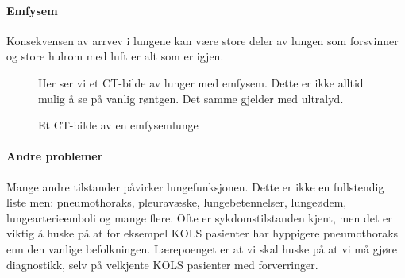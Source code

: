 			\paragraph{Emfysem\\}
				Konsekvensen av arrvev i lungene kan være store deler av lungen som forsvinner og store hulrom med luft er alt som er igjen. 
					\begin{figure}[ht]
                      \centering
                      \caption{Et CT-bilde av en emfysemlunge}
                      {Her ser vi et CT-bilde av lunger med emfysem. Dette er ikke alltid mulig å se på vanlig røntgen. Det samme gjelder med ultralyd.}%
                    \end{figure}
            \paragraph{Andre problemer\\}
            	Mange andre tilstander påvirker lungefunksjonen. Dette er ikke en fullstendig liste men: pneumothoraks, pleuravæske, lungebetennelser, lungeødem, lungearterieemboli og mange flere. Ofte er sykdomstilstanden kjent, men det er viktig å huske på at for eksempel KOLS pasienter har hyppigere pneumothoraks enn den vanlige befolkningen. Lærepoenget er at vi skal huske på at vi må gjøre diagnostikk, selv på velkjente KOLS pasienter med forverringer. 

